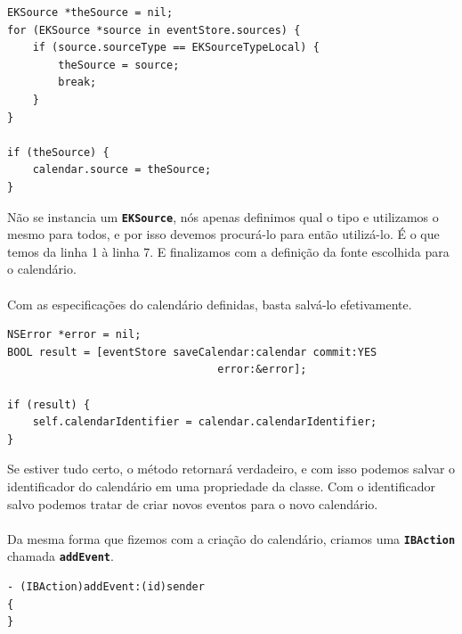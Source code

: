 \documentclass[a4paper,12pt,brazil,doubleside]{book}
\begin{document}
\pagebreak

\begin{listing}
\begin{verbatim}
EKSource *theSource = nil;
for (EKSource *source in eventStore.sources) {
    if (source.sourceType == EKSourceTypeLocal) {
        theSource = source;
        break;
    }
}
    
if (theSource) {
    calendar.source = theSource;
}
\end{verbatim}
\end{listing}

Não se instancia um \texttt{\textbf{EKSource}}, nós apenas definimos qual o tipo e utilizamos o mesmo para todos, e por isso devemos procurá-lo para então utilizá-lo. É o que temos da linha 1 à linha 7. E finalizamos com a definição da fonte escolhida para o calendário.
\paragraph{}Com as especificações do calendário definidas, basta salvá-lo efetivamente.

\begin{listing}
\begin{verbatim}
NSError *error = nil;
BOOL result = [eventStore saveCalendar:calendar commit:YES
                                 error:&error];

if (result) {
	self.calendarIdentifier = calendar.calendarIdentifier;
}
\end{verbatim}
\end{listing}

Se estiver tudo certo, o método retornará verdadeiro, e com isso podemos salvar o identificador do calendário em uma propriedade da classe. Com o identificador salvo podemos tratar de criar novos eventos para o novo calendário.
\paragraph{}Da mesma forma que fizemos com a criação do calendário, criamos uma \texttt{\textbf{IBAction}} chamada \texttt{\textbf{addEvent}}.

\begin{listing}
\begin{verbatim}
- (IBAction)addEvent:(id)sender
{
}
\end{verbatim}
\end{listing}
\end{document}
